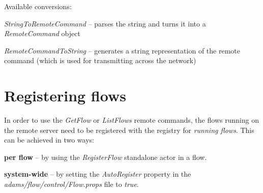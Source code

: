 Available conversions:
\begin{tight_itemize}
  \item \textit{StringToRemoteCommand} -- parses the string and turns it into
  a \textit{RemoteCommand} object
  \item \textit{RemoteCommandToString} -- generates a string representation of
  the remote command (which is used for transmitting across the network)
\end{tight_itemize}

\section{Registering flows}
In order to use the \textit{GetFlow} or \textit{ListFlows} remote commands,
the flows running on the remote server need to be registered with the
registry for \textit{running flows}. This can be achieved in two ways:
\begin{tight_itemize}
  \item \textbf{per flow} -- by using the \textit{RegisterFlow} standalone
  actor in a flow.
  \item \textbf{system-wide} -- by setting the \textit{AutoRegister} property
  in the \textit{adams/flow/control/Flow.props} file to \textit{true}.
\end{tight_itemize}

